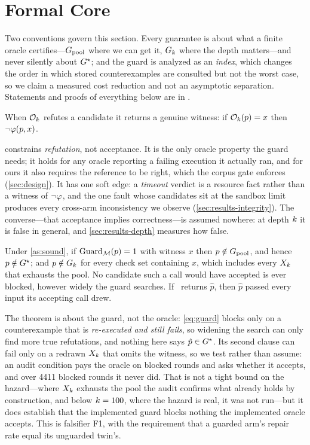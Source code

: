 \section{Formal Core}
\label{sec:theory}

Two conventions govern this section. Every guarantee is about what a finite
oracle certifies---$G_{\mathrm{pool}}$ where we can get it, $G_{k}$ where the depth
matters---and never silently about $G^{\star}$; and the
guard is analyzed as an \emph{index}, which changes the order in which stored
counterexamples are consulted but not the worst case, so we claim a measured
cost reduction and not an asymptotic separation. Statements and proofs of
everything below are in .

\begin{assumption}
\label{as:sound}
When $\mathcal{O}_{k}$ refutes a candidate it returns a genuine witness: if
$\mathcal{O}_{k}(p) = x$ then $\lnot\varphi(p, x)$.
\end{assumption}

 constrains \emph{refutation}, not acceptance. It is the only
oracle property the guard needs; it holds for any oracle reporting a failing
execution it actually ran, and for ours it also requires the reference to be
right, which the corpus gate enforces (\cref{sec:design}). It has one soft
edge: a \emph{timeout} verdict is a resource fact rather than a witness of
$\lnot\varphi$, and the one fault whose candidates sit at the sandbox limit
produces every cross-arm inconsistency we observe
(\cref{sec:results-integrity}). The converse---that acceptance implies
correctness---is assumed nowhere: at depth $k$ it is false in
general, and \cref{sec:results-depth} measures how false.

\begin{theorem}
\label{thm:sound}
Under \cref{as:sound}, if $\mathrm{Guard}_{\mathcal{M}}(p) = 1$ with witness $x$ then
$p \notin G_{\mathrm{pool}}$, and hence $p \notin G^{\star}$; and $p \notin G_{k}$ for every
check set containing $x$, which includes every $X_{k}$ that exhausts the pool. No
candidate such a call would have accepted is ever blocked, however widely the
guard searches. If \CEGMem\ returns $\hat p$, then $\hat p$ passed every input
its accepting call drew.
\end{theorem}

The theorem is about the guard, not the oracle: \cref{eq:guard} blocks only on
a counterexample that is \emph{re-executed and still fails}, so widening the
search can only find more true refutations, and nothing here says
$\hat p \in G^{\star}$. Its second clause can fail only on a redrawn $X_{k}$ that
omits the witness, so we test rather than assume: an audit condition pays the
oracle on blocked rounds and asks whether it accepts, and over \num{4411}
blocked rounds it never did. That is not a tight bound on the hazard---where
$X_{k}$ exhausts the pool the audit confirms what already holds by construction,
and below $k = 100$, where the hazard is real, it was not run---but
it does establish that the implemented guard blocks nothing the implemented
oracle accepts. This is falsifier F1, with the requirement that a guarded arm's
repair rate equal its unguarded twin's.

